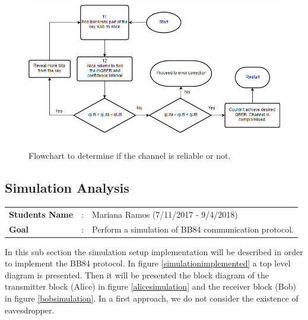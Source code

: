\begin{refsection}
	
\begin{figure}[H]
	\centering
	\includegraphics[width=1\textwidth,height=7cm]{./sdf/bb84_with_discrete_variables/figures/qberEstimation.png}
	\caption{Flowchart to determine if the channel is reliable or not.}\label{fig:flowQber}
\end{figure}



\newpage

\subsection{Simulation Analysis}

\begin{tcolorbox}	
\begin{tabular}{p{2.75cm} p{0.2cm} p{10.5cm}} 	
\textbf{Students Name}  &:& Mariana Ramos (7/11/2017 - 9/4/2018) \\
\textbf{Goal}          &:& Perform a simulation of BB84 communication protocol.
\end{tabular}
\end{tcolorbox}

In this sub section the simulation setup implementation will be described in order to implement the BB84 protocol. In figure \ref{simulationimplemented} a top level diagram is presented. Then it will be presented the block diagram of the transmitter block (Alice) in figure \ref{alicesimulation} and the receiver block (Bob) in figure \ref{bobsimulation}. In a first approach, we do not consider the existence of eavesdropper.


\end{refsection}
